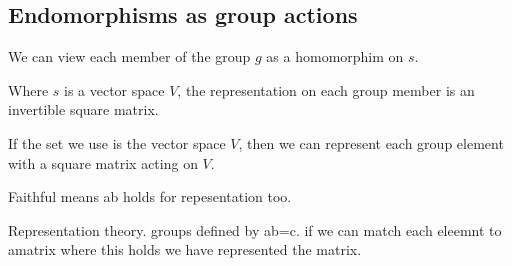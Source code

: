 
\subsection{Endomorphisms as group actions}

We can view each member of the group \(g\) as a homomorphim on \(s\).

Where \(s\) is a vector space \(V\), the representation on each group member is an invertible square matrix.

If the set we use is the vector space \(V\), then we can represent each group element with a square matrix acting on \(V\).

Faithful means a\ne b holds for repesentation too.

Representation theory. groups defined by ab=c. if we can match each eleemnt to amatrix where this holds we have represented the matrix.

